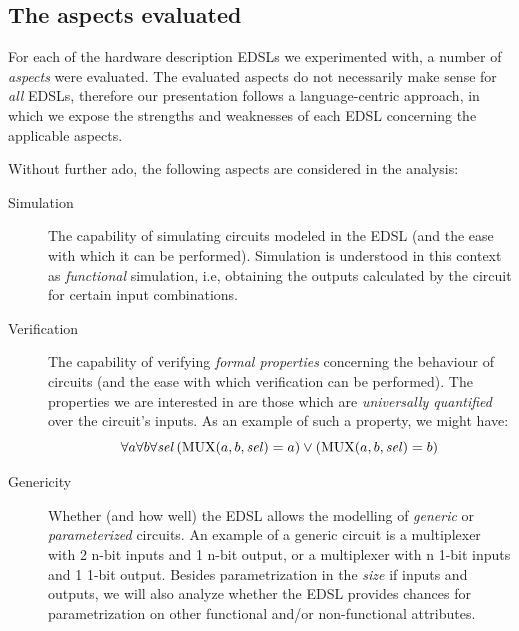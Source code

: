 \documentclass[a4paper]{article}
\begin{document}
        \subsection{The aspects evaluated}
        \label{subsec:aspects}
            For each of the hardware description EDSLs we experimented with, a number of
            \emph{aspects} were evaluated. The evaluated aspects do not necessarily make sense for
            \emph{all} EDSLs, therefore our presentation follows a language-centric approach, in
            which we expose the strengths and weaknesses of each EDSL concerning the applicable
            aspects.

            Without further ado, the following aspects are considered in the analysis:

            \begin{description}
                \item[Simulation]
                    The capability of simulating circuits modeled in the EDSL (and the ease with
                    which it can be performed). Simulation is understood in this context as
                    \emph{functional} simulation, i.e, obtaining the outputs calculated by the
                    circuit for certain input combinations.

                \item[Verification]
                    The capability of verifying \emph{formal properties} concerning the behaviour of
                    circuits (and the ease with which verification can be performed). The properties
                    we are interested in are those which are \emph{universally quantified} over the
                    circuit's inputs. As an example of such a property, we might have:
                    \[
                        \forall a \forall b \forall \text{\textit{sel}}
                            \left( \text{MUX}(a,b,\text{\textit{sel}}) = a \right)
                            \vee
                            \left( \text{MUX}(a,b,\text{\textit{sel}}) = b \right)
                    \]

                \item[Genericity]
                    Whether (and how well) the EDSL allows the modelling of \emph{generic} or
                    \emph{parameterized} circuits. An example of a generic circuit is a multiplexer
                    with 2 n-bit inputs and 1 n-bit output, or a multiplexer with n 1-bit inputs and
                    1 1-bit output. Besides parametrization in the \emph{size} if inputs and
                    outputs, we will also analyze whether the EDSL provides chances for
                    parametrization on other functional and/or non-functional attributes.


\end{description}
\end{document}
